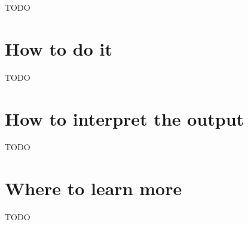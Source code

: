 \documentclass[
]{book}
\begin{document}
TODO

\hypertarget{how-to-do-it-23}{%
\section{How to do it}\label{how-to-do-it-23}}

TODO

\hypertarget{how-to-interpret-the-output-23}{%
\section{How to interpret the output}\label{how-to-interpret-the-output-23}}

TODO

\hypertarget{where-to-learn-more-23}{%
\section{Where to learn more}\label{where-to-learn-more-23}}

TODO

  
\end{document}
